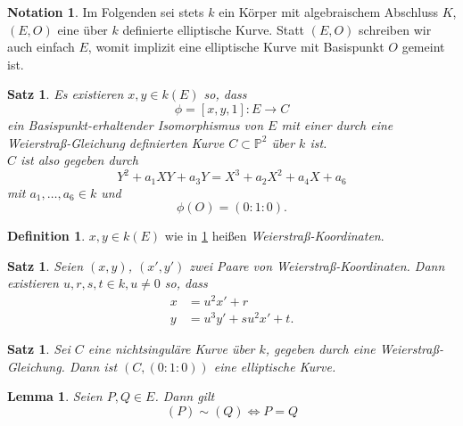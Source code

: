 \documentclass{amsart}
\theoremstyle{plain}
\newtheorem{proposition}[subsection]{Satz}
\newtheorem{lemma}[subsection]{Lemma}
\theoremstyle{definition}
\newtheorem{definition}[subsection]{Definition}
\newtheorem*{notation}{Notation}
\newcommand{\projspace}{\mathds{P}}
\begin{document}
\begin{notation}
	Im Folgenden sei stets $k$ ein Körper mit algebraischem Abschluss $K$, $(E, O)$ eine über $k$ definierte elliptische Kurve. 
	Statt $(E, O)$ schreiben wir auch einfach $E$, womit implizit eine elliptische Kurve mit Basispunkt $O$ gemeint ist.
\end{notation}

\begin{proposition}
	\label{prop-existenz-weierstrass-koordinaten}
	Es existieren $x, y \in k(E)$ so, dass
	\begin{equation*}
		\phi = [x, y, 1] : E \rightarrow C
	\end{equation*}
	ein Basispunkt-erhaltender Isomorphismus von $E$ mit einer durch eine Weierstraß-Gleichung definierten Kurve $C \subset \projspace^2$ über $k$ ist. \\
	$C$ ist also gegeben durch
	\begin{equation*}
		Y^2 + a_1 XY + a_3 Y = X^3 + a_2 X^2 + a_4 X + a_6
	\end{equation*}
	mit $a_1, \dots, a_6 \in k$ und
	\begin{equation*}
		\phi(O) = (0 : 1 : 0).
	\end{equation*}
\end{proposition}

\begin{definition}
	$x, y \in k(E)$ wie in \ref{prop-existenz-weierstrass-koordinaten} heißen {\it Weierstraß-Koordinaten}.
\end{definition}

\begin{proposition}
	Seien $(x, y)$, $(x', y')$ zwei Paare von Weierstraß-Koordinaten. Dann existieren $u, r, s, t \in k, u \neq 0$ so, dass
	\begin{align*}
		x &= u^2 x' + r \\
		y &= u^3 y' + s u^2 x' + t.
	\end{align*}
\end{proposition}

\begin{proposition}
	Sei $C$ eine nichtsinguläre Kurve über $k$, gegeben durch eine Weierstraß-Gleichung. Dann ist $(C, (0 : 1 : 0))$ eine elliptische Kurve.
\end{proposition}

\begin{lemma}
	Seien $P, Q \in E$. Dann gilt
	\begin{equation*}
		(P) \sim (Q) \Leftrightarrow P = Q
	\end{equation*}
\end{lemma}
\end{document}
